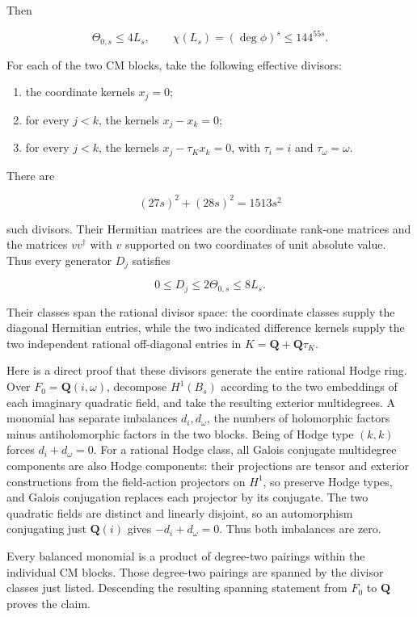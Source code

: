 Then

\[
 \Theta_{0,s}\le4L_s,\qquad
 \chi(L_s)=(\deg\phi)^s\le144^{55s}.
 \tag{F12.14}
\]

For each of the two CM blocks, take the following effective divisors:

\begin{enumerate}
\def\labelenumi{\arabic{enumi}.}
\item
  the coordinate kernels \(x_j=0\);
\item
  for every \(j<k\), the kernels \(x_j-x_k=0\);
\item
  for every \(j<k\), the kernels \(x_j-\tau_Kx_k=0\), with \(\tau_i=i\)
  and \(\tau_\omega=\omega\).
\end{enumerate}

There are

\[
 (27s)^2+(28s)^2=1513s^2
 \tag{F12.15}
\]

such divisors. Their Hermitian matrices are the coordinate rank-one
matrices and the matrices \(vv^\dagger\) with \(v\) supported on two
coordinates of unit absolute value. Thus every generator \(D_j\)
satisfies

\[
 0\le D_j\le2\Theta_{0,s}\le8L_s.
 \tag{F12.16}
\]

Their classes span the rational divisor space: the coordinate classes
supply the diagonal Hermitian entries, while the two indicated
difference kernels supply the two independent rational off-diagonal
entries in \(K=\mathbf Q+\mathbf Q\tau_K\).

Here is a direct proof that these divisors generate the entire rational
Hodge ring. Over \(F_0=\mathbf Q(i,\omega)\), decompose \(H^1(B_s)\)
according to the two embeddings of each imaginary quadratic field, and
take the resulting exterior multidegrees. A monomial has separate
imbalances \(d_i,d_\omega\), the numbers of holomorphic factors minus
antiholomorphic factors in the two blocks. Being of Hodge type \((k,k)\)
forces \(d_i+d_\omega=0\). For a rational Hodge class, all Galois
conjugate multidegree components are also Hodge components: their
projections are tensor and exterior constructions from the field-action
projectors on \(H^1\), so preserve Hodge types, and Galois conjugation
replaces each projector by its conjugate. The two quadratic fields are
distinct and linearly disjoint, so an automorphism conjugating just
\(\mathbf Q(i)\) gives \(-d_i+d_\omega=0\). Thus both imbalances are
zero.

Every balanced monomial is a product of degree-two pairings within the
individual CM blocks. Those degree-two pairings are spanned by the
divisor classes just listed. Descending the resulting spanning statement
from \(F_0\) to \(\mathbf Q\) proves the claim.

